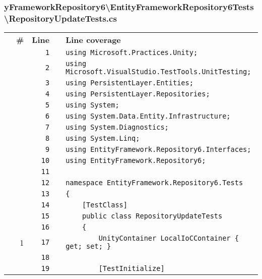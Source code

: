\documentclass[a4paper,10pt]{article}
\begin{document}
\subsubsection{yFrameworkRepository6\textbackslash EntityFrameworkRepository6Tests\textbackslash RepositoryUpdateTests.cs}
\begin{longtable}[l]{lrrll}
\textbf{} & \textbf{\#} & \textbf{Line} & \textbf{} & \textbf{Line coverage}\\
\cellcolor{gray} &  & \verb~1~ & & \verb~using Microsoft.Practices.Unity;~\\
\cellcolor{gray} &  & \verb~2~ & & \verb~using Microsoft.VisualStudio.TestTools.UnitTesting;~\\
\cellcolor{gray} &  & \verb~3~ & & \verb~using PersistentLayer.Entities;~\\
\cellcolor{gray} &  & \verb~4~ & & \verb~using PersistentLayer.Repositories;~\\
\cellcolor{gray} &  & \verb~5~ & & \verb~using System;~\\
\cellcolor{gray} &  & \verb~6~ & & \verb~using System.Data.Entity.Infrastructure;~\\
\cellcolor{gray} &  & \verb~7~ & & \verb~using System.Diagnostics;~\\
\cellcolor{gray} &  & \verb~8~ & & \verb~using System.Linq;~\\
\cellcolor{gray} &  & \verb~9~ & & \verb~using EntityFramework.Repository6.Interfaces;~\\
\cellcolor{gray} &  & \verb~10~ & & \verb~using EntityFramework.Repository6;~\\
\cellcolor{gray} &  & \verb~11~ & & \verb~~\\
\cellcolor{gray} &  & \verb~12~ & & \verb~namespace EntityFramework.Repository6.Tests~\\
\cellcolor{gray} &  & \verb~13~ & & \verb~{~\\
\cellcolor{gray} &  & \verb~14~ & & \verb~    [TestClass]~\\
\cellcolor{gray} &  & \verb~15~ & & \verb~    public class RepositoryUpdateTests~\\
\cellcolor{gray} &  & \verb~16~ & & \verb~    {~\\
\cellcolor{green} & 1 & \verb~17~ & & \verb~        UnityContainer LocalIoCContainer { get; set; }~\\
\cellcolor{gray} &  & \verb~18~ & & \verb~~\\
\cellcolor{gray} &  & \verb~19~ & & \verb~        [TestInitialize]~\\

\end{longtable}
\end{document}
